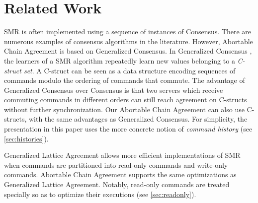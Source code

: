 \begin{comment}
Abortable Chain Agreement builds on several recent advances in SMR
algorithms: ACA allows acceptors to only eventually reach agreement,
like in Generalized Paxos \cite{Lamport05GeneralizeConsensus},
boosting performance when most commands commute; ACA allows fast
execution of read commands like in Generalized Lattice Agreement
\cite{FalerioETAL12GeneralizedLatticeAgreement}; ACA implementations
can tolerate $f$ faults with only $f+1$ replicas and replace crashed replicas
upon changing round, as in Vertical Paxos  \cite{LamportMalkhiZhou09VerticalPaxosPrimarybackupReplication}.  
\end{comment}

\section{Related Work}
\label{sec:related}

SMR is often implemented using a sequence of instances of Consensus.
There are numerous examples of consensus algorithms in the literature.
However, Abortable Chain Agreement is based on Generalized Consensus. 
In Generalized Consensus \cite{Lamport05GeneralizeConsensus}, the learners of a
SMR algorithm repeatedly learn new values belonging to a \emph{C-struct set}. A
C-struct can be seen as a data structure encoding  sequences of commands modulo
the ordering of commands that commute. The advantage of Generalized
Consensus over Consensus is that
two servers which receive commuting commands in different orders can still reach
agreement on C-structs without further synchronization. 
Our Abortable Chain Agreement can also use C-structs, with the same advantages
as Generalized Consensus. For simplicity, the presentation in this
paper uses the more concrete notion of \emph{command history} (see
\cref{sec:histories}).

Generalized Lattice Agreement \cite{FalerioETAL12GeneralizedLatticeAgreement} allows more efficient implementations of SMR when
commands are partitioned into read-only commands and write-only commands.
Abortable Chain Agreement supports the same optimizations as Generalized Lattice Agreement.
Notably, read-only commands are treated specially so as to optimize their
executions (see \cref{sec:readonly}).

